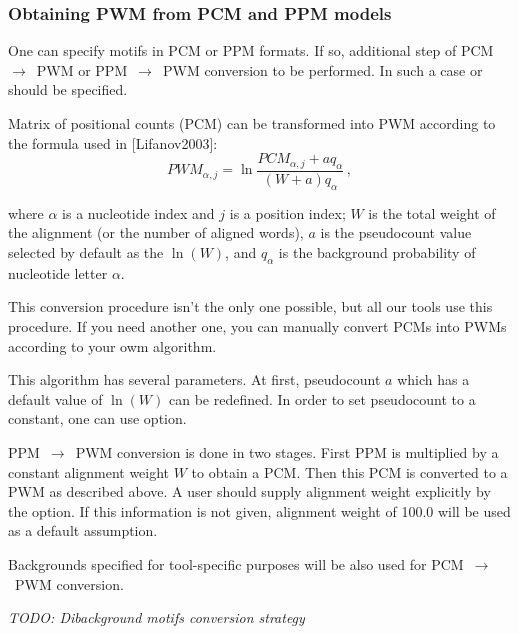 \subsubsection{Obtaining PWM from PCM and PPM models}
One can specify motifs in PCM or PPM formats. If so, additional step of PCM~$\rightarrow$~PWM or PPM~$\rightarrow$~PWM conversion to be performed. In such a case  or  should be specified.

Matrix of positional counts (PCM) can be transformed into PWM according to the formula used in [Lifanov2003]:
$$ PWM_{\alpha,j} = \ln\frac{ PCM_{\alpha,j} + aq_{\alpha} }{ (W+a)q_{\alpha} }\,, $$

where $\alpha$ is a nucleotide index and $j$ is a position index; $W$ is the total weight of the alignment (or the number of aligned words), $a$ is the 
pseudocount value selected by default as the $\ln(W)$, and $q_{\alpha}$ is the background probability of nucleotide letter $\alpha$.

This conversion procedure isn't the only one possible, but all our tools use this procedure. If you need another one, you can manually convert PCMs into PWMs according to your owm algorithm.

This algorithm has several parameters. At first, pseudocount $a$ which has a default value of $\ln(W)$ can be redefined. In order to set pseudocount to a constant, one can use  option.

PPM~$\rightarrow$~PWM conversion is done in two stages. First PPM is multiplied by a constant alignment weight $W$ to obtain a PCM. Then this PCM is converted to a PWM as described above. 
A user should supply alignment weight explicitly by the  option. If this information is not given, alignment weight of 100.0 will be used as a default assumption.

Backgrounds specified for tool-specific purposes will be also used for PCM~$\rightarrow$~PWM conversion.

\emph{TODO: Dibackground motifs conversion strategy}
